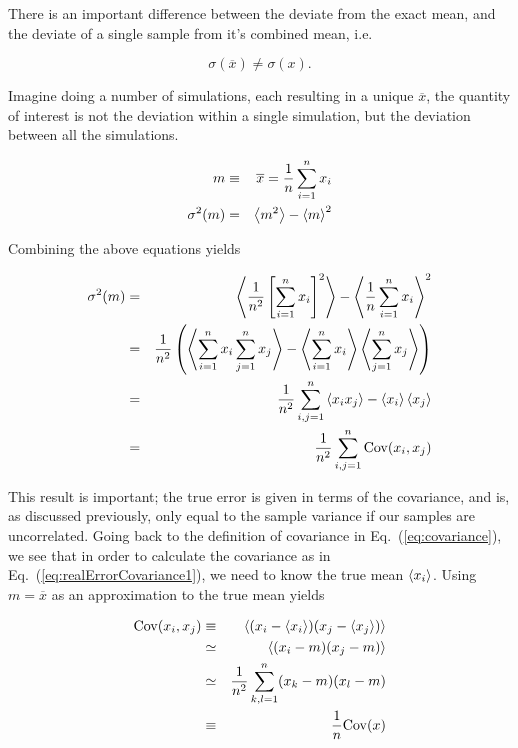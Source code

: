 There is an important difference between the deviate from the exact mean, and the deviate of a single sample from it's combined mean, i.e.

\begin{equation}
 \sigma(\overline{x}) \ne \sigma(x).
\end{equation}

Imagine doing a number of simulations, each resulting in a unique $\overline{x}$, the quantity of interest is not the deviation within a single simulation, but the deviation between all the simulations.

\begin{eqnarray}
 m &\equiv& \overline{x} = \frac{1}{n}\sum_{i=1}^n x_i \label{eq:meanx}\\
 \sigma^2(m) &=& \left< m^2 \right> - \left< m \right>^2 \label{eq:sigma_m}
\end{eqnarray}

Combining the above equations yields

\begin{eqnarray}
\label{eq:realErrorCovariance1}
  \sigma^2(m) &=& \left< \frac{1}{n^2}\left[\sum_{i=1}^nx_i\right]^2 \right> - \left< \frac{1}{n}\sum_{i=1}^n x_i \right>^2 \nonumber\\
              &=& \frac{1}{n^2}\left( \left< \sum_{i=1}^n x_i\sum_{j=1}^n x_j \right> - \left< \sum_{i=1}^n x_i \right>\left< \sum_{j=1}^n x_j \right>  \right) \nonumber\\
              &=& \frac{1}{n^2}\sum_{i,j=1}^n \left< x_ix_j \right> - \left< x_i \right>\left< x_j \right> \nonumber\\
              &=& \frac{1}{n^2}\sum_{i,j=1}^n \mathrm{Cov}(x_i, x_j)
\end{eqnarray}

This result is important; the true error is given in terms of the covariance, and is, as discussed previously, only equal to the sample variance if our samples are uncorrelated. Going back to the definition of covariance in Eq.~(\ref{eq:covariance}), we see that in order to calculate the covariance as in Eq.~(\ref{eq:realErrorCovariance1}), we need to know the true mean $\left< x_i \right>$. Using $m=\overline{x}$ as an approximation to the true mean yields   

\begin{eqnarray}
 \mathrm{Cov}(x_i, x_j) &\equiv& \left< (x_i - \left< x_i \right>)(x_j - \left< x_j \right>) \right> \nonumber\\
                &\simeq& \left< (x_i - m)(x_j - m) \right> \nonumber\\
                &\simeq& \frac{1}{n^2}\sum_{k,l=1}^n (x_k-m)(x_l-m) \\
                &\equiv& \frac{1}{n}\mathrm{Cov}(x)
\end{eqnarray}

